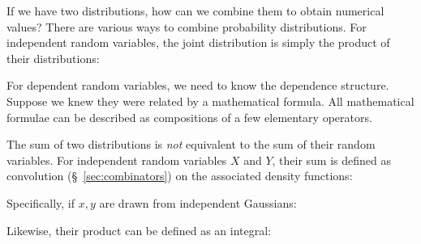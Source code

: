 \documentclass{article}
\begin{document}
If we have two distributions, how can we combine them to obtain numerical values? There are various ways to combine probability distributions. For independent random variables, the joint distribution is simply the product of their distributions:


\begin{prooftree}
\end{prooftree}

For dependent random variables, we need to know the dependence structure. Suppose we knew they were related by a mathematical formula. All mathematical formulae can be described as compositions of a few elementary operators.

The sum of two distributions is \textit{not} equivalent to the sum of their random variables. For independent random variables $X$ and $Y$, their sum is defined as convolution (\S~\ref{sec:combinators}) on the associated density functions:


\begin{prooftree}
\end{prooftree}

Specifically, if $x, y$ are drawn from independent Gaussians:


\begin{prooftree}
\end{prooftree}

Likewise, their product can be defined as an integral:


\begin{prooftree}
\end{prooftree}
\end{document}
